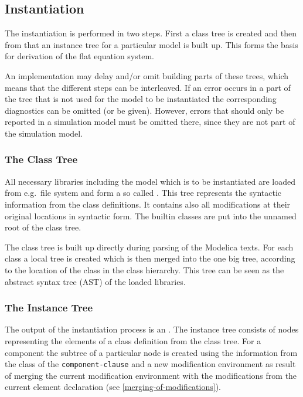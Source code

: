 \subsection{Instantiation}\label{instantiation}

The instantiation is performed in two steps. First a class tree is
created and then from that an instance tree for a particular model is
built up. This forms the basis for derivation of the flat equation
system.

An implementation may delay and/or omit building parts of these trees,
which means that the different steps can be interleaved. If an error
occurs in a part of the tree that is not used for the model to be
instantiated the corresponding diagnostics can be omitted (or be given).
However, errors that should only be reported in a simulation model must
be omitted there, since they are not part of the simulation model.

\subsubsection{The Class Tree}\label{the-class-tree}

All necessary libraries including the model which is to be instantiated are loaded from e.g.\ file system and form a so called .
This tree represents the syntactic information from the class definitions.
It contains also all modifications at their original locations in syntactic form.
The builtin classes are put into the unnamed root of the class tree.

\begin{nonnormative}
The class tree is built up directly during parsing of the Modelica texts.  For each class a local tree is created which is then merged into the one big tree, according
to the location of the class in the class hierarchy.  This tree can be seen as the abstract syntax tree (AST) of the loaded libraries.
\end{nonnormative}

\subsubsection{The Instance Tree}\label{the-instance-tree}

The output of the instantiation process is an .
The instance tree consists of nodes representing the elements of a class definition from the class tree.
For a component the subtree of a particular node is created using the information from the class of the \lstinline[language=grammar]!component-clause! and a new modification environment as result of merging the current modification environment with the modifications from the current element declaration (see \cref{merging-of-modifications}).

